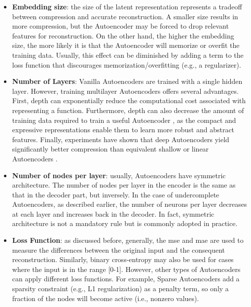 \begin{itemize}
\item \textbf{Embedding size}: the size of the latent representation represents a tradeoff between compression and accurate reconstruction. A smaller size results in more compression, but the Autoencoder may be forced to drop relevant features for reconstruction. On the other hand, the higher the embedding size, the more likely it is that the Autoencoder will memorize or overfit the training data. Usually, this effect can be diminished by adding a term to the loss function that discourages memorization/overfitting (e.g., a regularizer).

\item \textbf{Number of Layers}: Vanilla Autoencoders are trained with a single hidden layer. However, training multilayer Autoencoders offers several advantages. First, depth can exponentially reduce the computational cost associated with representing a function. Furthermore, depth can also decrease the amount of training data required to train a useful Autoencoder \citep[p.~506]{goodfellow2016deep}, as the compact and expressive representations enable them to learn more robust and abstract features. Finally, experiments have shown that deep Autoencoders yield significantly better compression than equivalent shallow or linear Autoencoders \citep{hinton2006reducing}.

\item \textbf{Number of nodes per layer}: usually, Autoencoders have symmetric architecture. The number of nodes per layer in the encoder is the same as that in the decoder part, but inversely. In the case of undercomplete Autoencoders, as described earlier, the number of neurons per layer decreases at each layer and increases back in the decoder. In fact, symmetric architecture is not a mandatory rule but is commonly adopted in practice.

\item \textbf{Loss Function}: as discussed before, generally, the \acs{mse} and \acs{mae} are used to measure the differences between the original input and the consequent reconstruction. Similarly, binary cross-entropy may also be used for cases where the input is in the range [0-1]. However, other types of Autoencoders can apply different loss functions. For example, Sparse Autoencoders add a sparsity constraint (e.g., L1 regularization) as a penalty term, so only a fraction of the nodes will become active (i.e., nonzero values).
\end{itemize}

